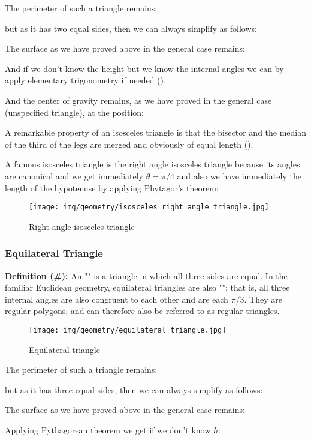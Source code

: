 {	The perimeter of such a triangle remains:
	
	but as it has two equal sides, then we can always simplify as follows:
	
	The surface as we have proved above in the general case remains:
	
	And if we don't know the height but we know the internal angles we can by apply elementary trigonometry if needed ().
	
	And the center of gravity remains, as we have proved in the general case (unspecified triangle), at the position:
	
	A remarkable property of an isosceles triangle is that the bisector and the median of the third of the legs are merged and obviously of equal length ().
	
	A famous isosceles triangle is the right angle isosceles triangle because its angles are canonical and we get immediately $\theta=\pi/4$ and also we have immediately the length of the hypotenuse by applying Phytagor's theorem:
	\begin{figure}[H]
		\centering
		\texttt{[image: img/geometry/isosceles\_right\_angle\_triangle.jpg]}
		\caption{Right angle isosceles triangle}
	\end{figure}
	
	\pagebreak
	\subsubsection{Equilateral Triangle}
	\textbf{Definition (\#\mydef):} An "" is a triangle in which all three sides are equal. In the familiar Euclidean geometry, equilateral triangles are also ""; that is, all three internal angles are also congruent to each other and are each $\pi/3$. They are regular polygons, and can therefore also be referred to as regular triangles.
	\begin{figure}[H]
		\centering
		\texttt{[image: img/geometry/equilateral\_triangle.jpg]}
		\caption{Equilateral triangle}
	\end{figure}
	The perimeter of such a triangle remains:
	
	but as it has three equal sides, then we can always simplify as follows:
	
	The surface as we have proved above in the general case remains:
	
	Applying Pythagorean theorem we get if we don't know $h$:
	
}
